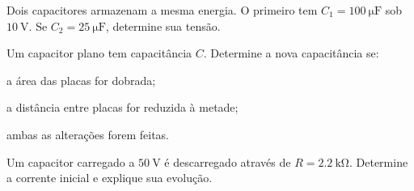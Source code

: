 \begin{questao}[2]{}

Dois capacitores armazenam a mesma energia. O primeiro tem
$C_1=\SI{100}{\micro\farad}$ sob $\SI{10}{\volt}$. Se
$C_2=\SI{25}{\micro\farad}$, determine sua tensão.


\end{questao}
\begin{questao}[2]{}

Um capacitor plano tem capacitância $C$. Determine a nova capacitância se:
\begin{itensq}
\item a área das placas for dobrada;
\item a distância entre placas for reduzida à metade;
\item ambas as alterações forem feitas.
\end{itensq}


\end{questao}
\begin{questao}[2]{}

Um capacitor carregado a $\SI{50}{\volt}$ é descarregado através de
$R=\SI{2.2}{\kilo\ohm}$. Determine a corrente inicial e explique sua evolução.


\end{questao}

